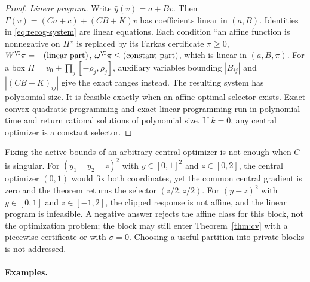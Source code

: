 \begin{proof}
\emph{Linear program.} Write $\bar y(v)=a+Bv$. Then
$\Gamma(v)=(Ca+c)+(CB+K)v$ has coefficients linear in $(a,B)$. Identities in
\eqref{eq:recog-system} are linear equations. Each condition ``an affine
function is nonnegative on $\Pi$'' is replaced by its Farkas certificate
$\pi\ge0$, $W^{\T}\pi=-(\text{linear part})$,
$\omega^{\T}\pi\le(\text{constant part})$, which is linear in $(a,B,\pi)$.
For a box $\Pi=v_0+\prod_j[-\rho_j,\rho_j]$, auxiliary variables bounding
$|B_{ij}|$ and $|(CB+K)_{ij}|$ give the exact ranges instead. The resulting
system has polynomial size. It is feasible exactly when an affine optimal
selector exists. Exact convex quadratic programming
\cite{KozlovTarasovKhachiyan1980} and exact linear programming
\cite{GrotschelLovaszSchrijver1988} run in polynomial time and return rational
solutions of polynomial size. If $k=0$, any central optimizer is a constant
selector.
\end{proof}

Fixing the active bounds of an arbitrary central optimizer is not enough when
$C$ is singular. For $(y_1+y_2-z)^2$ with $y\in[0,1]^2$ and $z\in[0,2]$, the
central optimizer $(0,1)$ would fix both coordinates, yet the common central
gradient is zero and the theorem returns the selector $(z/2,z/2)$. For
$(y-z)^2$ with $y\in[0,1]$ and $z\in[-1,2]$, the clipped response is not
affine, and the linear program is infeasible. A negative answer rejects the
affine class for this block, not the optimization problem; the block may
still enter Theorem~\ref{thm:cv} with a piecewise certificate or with
$\sigma=0$. Choosing a useful partition into private blocks is not addressed.

\paragraph{Examples.}

